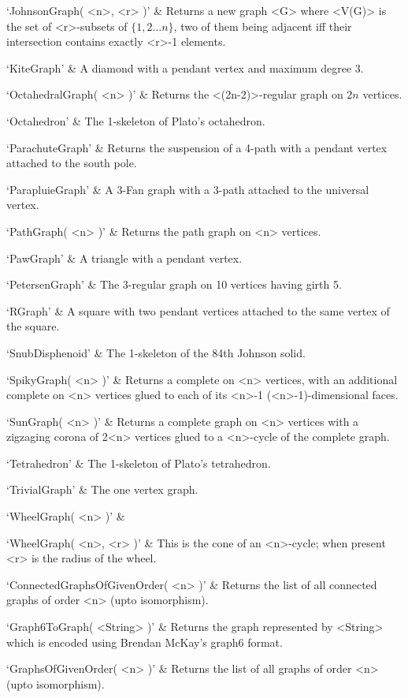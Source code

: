 `JohnsonGraph( <n>, <r> )' & 
Returns a new graph <G> where <V(G)> is the set of <r>-subsets of $\{1,2 \ldots n\}$, two of them being adjacent iff their intersection contains exactly <r>-1 elements.

`KiteGraph' & 
A diamond with a pendant vertex and maximum degree 3.

`OctahedralGraph( <n> )' & 
Returns the <(2n-2)>-regular graph on $2n$ vertices.

`Octahedron' & 
The 1-skeleton of Plato's octahedron.

`ParachuteGraph' & 
Returns the suspension of a 4-path with a pendant vertex attached to the south pole.

`ParapluieGraph' & 
A 3-Fan graph with a 3-path attached to the universal vertex.

`PathGraph( <n> )' & 
Returns the path graph on <n> vertices.

`PawGraph' & 
A triangle with a pendant vertex.

`PetersenGraph' & 
The 3-regular graph on 10 vertices having girth 5.

`RGraph' & 
A  square  with  two  pendant  vertices attached to the same vertex of the square.

`SnubDisphenoid' & 
The 1-skeleton of the 84th Johnson solid.

`SpikyGraph( <n> )' & 
Returns a complete on <n> vertices, with an additional complete on <n> vertices glued to each of its <n>-1
 (<n>-1)-dimensional faces.

`SunGraph( <n> )' & 
Returns a complete graph on <n> vertices with a zigzaging corona of 2<n> vertices glued to a <n>-cycle of the complete graph.

`Tetrahedron' & 
The 1-skeleton of Plato's tetrahedron.

`TrivialGraph' & 
The one vertex graph.

`WheelGraph( <n> )' & 

`WheelGraph( <n>, <r> )' & 
This  is  the   cone  of  an  <n>-cycle; when present <r> is the radius of the wheel.
\enditems



\beginitems
`ConnectedGraphsOfGivenOrder( <n> )' &
Returns the list of all connected graphs of order <n> (upto isomorphism).

`Graph6ToGraph( <String> )' &
Returns the graph represented by <String> which is encoded using Brendan McKay's graph6 format. 

`GraphsOfGivenOrder( <n> )' &
Returns the list of all graphs of order <n> (upto isomorphism). 

